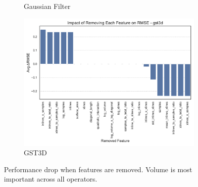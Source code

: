 \begin{figure}[htbp]
\begin{subfigure}[t]{0.32\textwidth}
        \caption{Gaussian Filter}
    \end{subfigure}
    \hfill
    \begin{subfigure}[t]{0.32\textwidth}
        \includegraphics[width=\textwidth]{assets/images/05/feature_impact_gst3d}
        \caption{\ac{GST3D}}
    \end{subfigure}
    \caption{Performance drop when features are removed. Volume is most important across all operators.}
    \label{fig:feature_impact_operator_subplots}
\end{figure}

